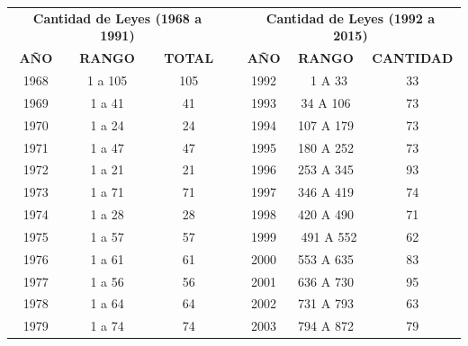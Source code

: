 \documentclass[conference]{IEEEtran}
\begin{document}
			\begin{table}[h]
				\centering		
				\begin{tabular}{|c|c|c|r|c|c|c|}
					
					\multicolumn{ 3}{|c|}{{\bf Cantidad de Leyes (1968 a 1991)}} &            & \multicolumn{ 3}{|c|}{{\bf Cantidad de Leyes (1992 a 2015)}} \\
					
					{\bf AÑO} & {\bf RANGO} & {\bf TOTAL} &            &  {\bf AÑO} & {\bf RANGO} & {\bf CANTIDAD} \\
					
					1968 &    1 a 105 &        105 &            &       1992 &     1 A 33 &         33 \\
					
					1969 &     1 a 41 &         41 &            &       1993 &   34 A 106 &         73 \\
					
					1970 &     1 a 24 &         24 &            &       1994 &  107 A 179 &         73 \\
					
					1971 &     1 a 47 &         47 &            &       1995 &  180 A 252 &         73 \\
					
					1972 &     1 a 21 &         21 &            &       1996 &  253 A 345 &         93 \\
					
					1973 &     1 a 71 &         71 &            &       1997 &  346 A 419 &         74 \\
					
					1974 &     1 a 28 &         28 &            &       1998 &  420 A 490 &         71 \\
					
					1975 &     1 a 57 &         57 &            &       1999 &  491 A 552 &         62 \\
					
					1976 &     1 a 61 &         61 &            &       2000 &  553 A 635 &         83 \\
					
					1977 &     1 a 56 &         56 &            &       2001 &  636 A 730 &         95 \\
					
					1978 &     1 a 64 &         64 &            &       2002 &  731 A 793 &         63 \\
					
					1979 &     1 a 74 &         74 &            &       2003 &  794 A 872 &         79 \\
					

\end{tabular}
\end{table}
\end{document}
